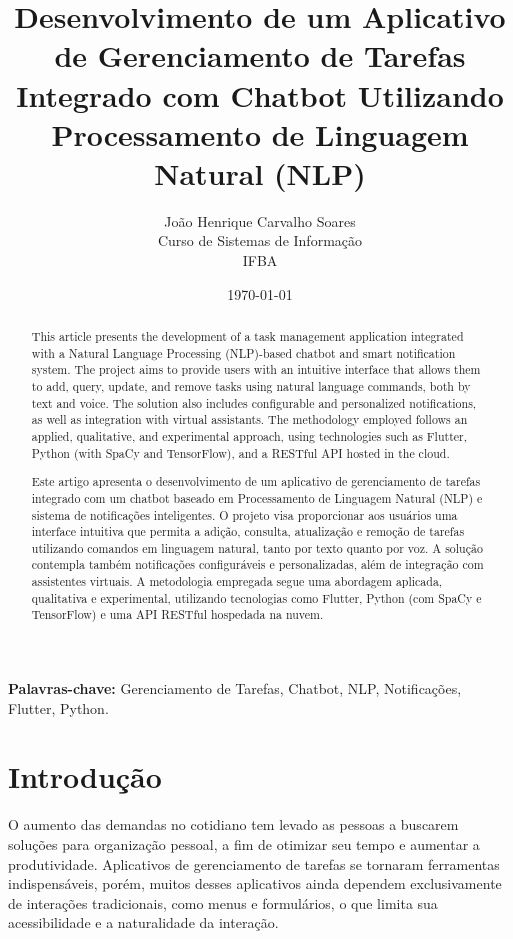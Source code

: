 \documentclass[a4paper,12pt]{article}
\title{\textbf{Desenvolvimento de um Aplicativo de Gerenciamento de Tarefas Integrado com Chatbot Utilizando Processamento de Linguagem Natural (NLP)}}
\author{João Henrique Carvalho Soares \\
Curso de Sistemas de Informação \\
IFBA}
\date{\today}
\begin{document}
\maketitle

\begin{abstract}
This article presents the development of a task management application integrated with a Natural Language Processing (NLP)-based chatbot and smart notification system. The project aims to provide users with an intuitive interface that allows them to add, query, update, and remove tasks using natural language commands, both by text and voice. The solution also includes configurable and personalized notifications, as well as integration with virtual assistants. The methodology employed follows an applied, qualitative, and experimental approach, using technologies such as Flutter, Python (with SpaCy and TensorFlow), and a RESTful API hosted in the cloud.
\end{abstract}

\begin{abstract}
Este artigo apresenta o desenvolvimento de um aplicativo de gerenciamento de tarefas integrado com um chatbot baseado em Processamento de Linguagem Natural (NLP) e sistema de notificações inteligentes. O projeto visa proporcionar aos usuários uma interface intuitiva que permita a adição, consulta, atualização e remoção de tarefas utilizando comandos em linguagem natural, tanto por texto quanto por voz. A solução contempla também notificações configuráveis e personalizadas, além de integração com assistentes virtuais. A metodologia empregada segue uma abordagem aplicada, qualitativa e experimental, utilizando tecnologias como Flutter, Python (com SpaCy e TensorFlow) e uma API RESTful hospedada na nuvem.
\end{abstract}

\textbf{Palavras-chave:} Gerenciamento de Tarefas, Chatbot, NLP, Notificações, Flutter, Python.

\onehalfspacing

\section{Introdução}

O aumento das demandas no cotidiano tem levado as pessoas a buscarem soluções para organização pessoal, a fim de otimizar seu tempo e aumentar a produtividade. Aplicativos de gerenciamento de tarefas se tornaram ferramentas indispensáveis, porém, muitos desses aplicativos ainda dependem exclusivamente de interações tradicionais, como menus e formulários, o que limita sua acessibilidade e a naturalidade da interação.
\end{document}

